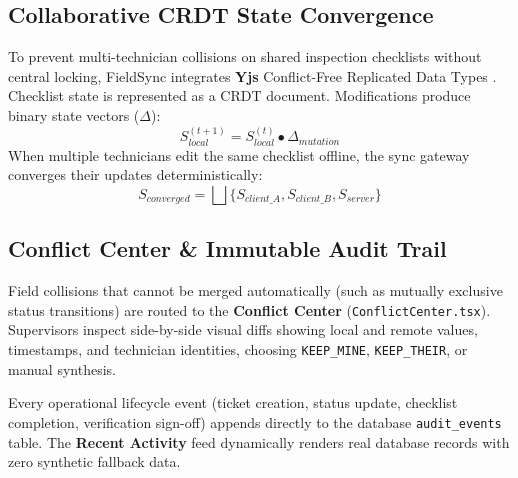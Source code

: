\documentclass[conference]{IEEEtran}
\begin{document}
\subsection{Collaborative CRDT State Convergence}
To prevent multi-technician collisions on shared inspection checklists without central locking, FieldSync integrates \textbf{Yjs} Conflict-Free Replicated Data Types \cite{nicolas2020yjs, baquero2014pure}. Checklist state is represented as a CRDT document. Modifications produce binary state vectors ($\Delta$):
\begin{equation}
S_{local}^{(t+1)} = S_{local}^{(t)} \bullet \Delta_{mutation}
\end{equation}
When multiple technicians edit the same checklist offline, the sync gateway converges their updates deterministically:
\begin{equation}
S_{converged} = \bigsqcup \{S_{client\_A}, S_{client\_B}, S_{server}\}
\end{equation}

\subsection{Conflict Center \& Immutable Audit Trail}
Field collisions that cannot be merged automatically (such as mutually exclusive status transitions) are routed to the \textbf{Conflict Center} (\texttt{ConflictCenter.tsx}). Supervisors inspect side-by-side visual diffs showing local and remote values, timestamps, and technician identities, choosing \texttt{KEEP\_MINE}, \texttt{KEEP\_THEIR}, or manual synthesis.

Every operational lifecycle event (ticket creation, status update, checklist completion, verification sign-off) appends directly to the database \texttt{audit\_events} table. The \textbf{Recent Activity} feed dynamically renders real database records with zero synthetic fallback data.
\end{document}

